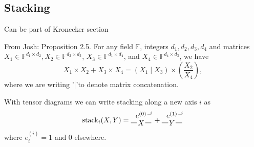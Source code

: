 \documentclass[oneside]{book}
\begin{document}
\subsection{Stacking}
Can be part of Kronecker section

From Josh:
Proposition 2.5. For any field $\mathbb{F}$, integers $d_1, d_2, d_3, d_4$ and matrices $X_1 \in \mathbb{F}^{d_1 \times d_2}, X_2 \in \mathbb{F}^{d_2 \times d_3}$, $X_3 \in \mathbb{F}^{d_1 \times d_4}$, and $X_4 \in \mathbb{F}^{d_4 \times d_3}$, we have
$$
X_1 \times X_2+X_3 \times X_4=\left(X_1 \mid X_3\right) \times\left(\frac{X_2}{X_4}\right),
$$
where we are writing '|'to denote matrix concatenation.

With tensor diagrams we can write stacking along a new axis $i$ as
\[
\mathrm{stack}_i(X, Y)
=
\begin{tikzpicture}[baseline=-.5em, inner sep = 1pt]
    \node (e) at (0, .2) {$e^{(0)}$};
    \draw (e) -- ++(.5,0) node[midway, above right, font=\tiny] {$i$};
    \node (X) at (0, -.2) {$X$};
    \draw (X) -- ++(.5,0);
    \draw (X) -- ++(-.5,0);
\end{tikzpicture}
+
\begin{tikzpicture}[baseline=-.5em, inner sep = 1pt]
    \node (e) at (0, .2) {$e^{(1)}$};
    \draw (e) -- ++(.5,0) node[midway, above right, font=\tiny] {$i$};
    \node (X) at (0, -.2) {$Y$};
    \draw (X) -- ++(.5,0);
    \draw (X) -- ++(-.5,0);
\end{tikzpicture}
\]
where $e^{(i)}_i=1$ and 0 elsewhere.
\end{document}
